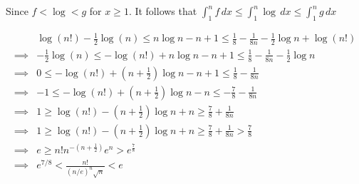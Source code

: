 \documentclass{article}
\begin{document}
Since $f<\log<g$ for $x\geq 1$. It follows that $\int_1^nf\, dx\leq
\int_1^n \log\, dx \leq \int_1^n g\, dx$

\begin{align*}
  &\log(n!) - \frac{1}{2}\log(n) \leq n\log n -n +1 \leq
    \frac{1}{8} - \frac{1}{8n} -\frac{1}{2}\log n + \log (n!)\\
  \implies&- \frac{1}{2}\log(n) \leq -\log (n!) + n\log n -n +1 \leq
            \frac{1}{8} - \frac{1}{8n} -\frac{1}{2}\log n\\
  \implies& 0 \leq -\log (n!) + \left(n+\frac{1}{2}\right)\log n -n +1 \leq
            \frac{1}{8} - \frac{1}{8n}\\
  \implies& -1 \leq -\log (n!) + \left(n+\frac{1}{2}\right)\log n -n \leq
            -\frac{7}{8} - \frac{1}{8n}\\
  \implies& 1 \geq \log (n!) - \left(n+\frac{1}{2}\right)\log n +n \geq
            \frac{7}{8} + \frac{1}{8n}\\
  \implies& 1 \geq \log (n!) - \left(n+\frac{1}{2}\right)\log n +n \geq
            \frac{7}{8} + \frac{1}{8n}>\frac{7}{8}\\
  \implies& e \geq n! n^{-\left(n+\frac{1}{2}\right)}e^n
            >e^{\frac{7}{8}}\\
  \implies& e^{7/8} < \frac{n!}{(n/e)^n\sqrt{n}} < e\\
\end{align*}
\end{document}
